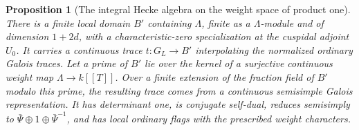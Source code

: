 \documentclass[a4paper,11pt]{article}
\newtheorem{proposition}{Proposition}[section]
\theoremstyle{definition}
\theoremstyle{remark}
\numberwithin{equation}{section}
\begin{document}
\begin{proposition}[The integral Hecke algebra on the weight space of product one]
\label{prop:bigweight364}
There is a finite local domain \(B'\) containing \(\Lambda\),
finite as a \(\Lambda\)-module and of dimension \(1+2d\), with
a characteristic-zero specialization at the cuspidal adjoint
\(U_0\). It carries a continuous trace \(t:G_L\to B'\)
interpolating the normalized ordinary Galois traces.
Let a prime of \(B'\) lie over the kernel of a surjective
continuous weight map \(\Lambda\to k[[T]]\). Over a finite
extension of the fraction field of \(B'\) modulo this prime,
the resulting trace comes from a continuous semisimple Galois
representation. It has determinant one, is conjugate self-dual,
reduces semisimply to \(\bar\Psi\oplus1\oplus\bar\Psi^{-1}\),
and has local ordinary flags with the prescribed weight
characters.
\end{proposition}
\end{document}
